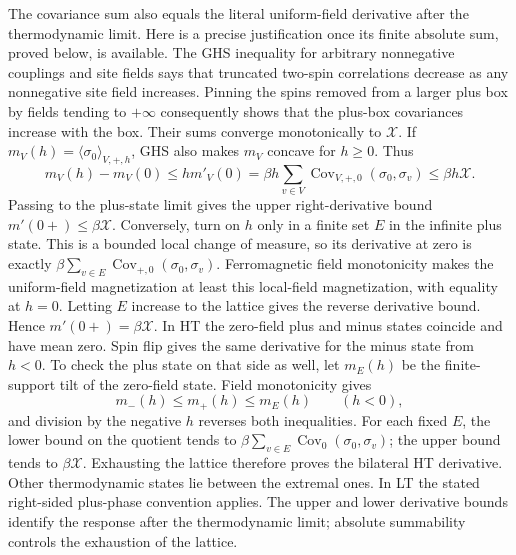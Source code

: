 \documentclass[11pt]{article}
\numberwithin{equation}{section}
\theoremstyle{definition}
\begin{document}
The covariance sum also equals the literal uniform-field derivative after
the thermodynamic limit. Here is a precise justification once its finite
absolute sum, proved below, is available. The GHS inequality for arbitrary
nonnegative couplings and site fields \cite[Theorem 1.5]{CGN} says that
truncated two-spin correlations decrease as any nonnegative site field
increases. Pinning the spins removed from a larger plus box by fields
tending to $+\infty$ consequently shows that the plus-box covariances
increase with the box. Their sums converge monotonically to $\mathcal X$.
If $m_V(h)=\langle\sigma_0\rangle_{V,+,h}$, GHS also makes $m_V$
concave for $h\ge0$. Thus
\[
 m_V(h)-m_V(0)\le h m'_V(0)
 =\beta h\sum_{v\in V}\operatorname{Cov}_{V,+,0}(\sigma_0,\sigma_v)
 \le\beta h\mathcal X.
\]
Passing to the plus-state limit gives the upper right-derivative bound
$m'(0+)\le\beta\mathcal X$. Conversely, turn on $h$ only in a finite
set $E$ in the infinite plus state. This is a bounded local change of
measure, so its derivative at zero is exactly
$\beta\sum_{v\in E}\operatorname{Cov}_{+,0}(\sigma_0,\sigma_v)$.
Ferromagnetic field monotonicity makes the uniform-field magnetization
at least this local-field magnetization, with equality at $h=0$.
Letting $E$ increase to the lattice gives the reverse derivative bound.
Hence $m'(0+)=\beta\mathcal X$. In HT the zero-field plus and minus
states coincide and have mean zero. Spin flip gives the same derivative
for the minus state from $h<0$. To check the plus state on that side as
well, let $m_E(h)$ be the finite-support tilt of the zero-field state.
Field monotonicity gives
\[
 m_-(h)\le m_+(h)\le m_E(h)\qquad(h<0),
\]
and division by the negative $h$ reverses both inequalities. For each
fixed $E$, the lower bound on the quotient tends to
$\beta\sum_{v\in E}\operatorname{Cov}_0(\sigma_0,\sigma_v)$;
the upper bound tends to $\beta\mathcal X$. Exhausting the lattice
therefore proves the bilateral HT derivative. Other thermodynamic states
lie between the extremal ones. In LT the stated right-sided plus-phase
convention applies. The upper and lower derivative bounds identify
the response after the thermodynamic limit; absolute summability
controls the exhaustion of the lattice.
\end{document}
